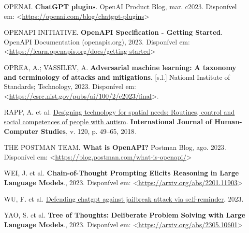 \documentclass[
]{article}
\newlength{\cslhangindent}
\newenvironment{CSLReferences}[2] %
 {\begin{list}{}{%
  \setlength{\itemindent}{0pt}
  \setlength{\leftmargin}{0pt}
  \setlength{\parsep}{0pt}
  \ifodd #1
   \setlength{\leftmargin}{\cslhangindent}
   \setlength{\itemindent}{-1\cslhangindent}
  \fi
  \setlength{\itemsep}{#2\baselineskip}}}
 {\end{list}}
\begin{document}
\begin{CSLReferences}{0}{1}
OPENAI. \textbf{{ChatGPT plugins}}. OpenAI Product Blog, mar. c2023.
Disponível em:
\textless{}\url{https://openai.com/blog/chatgpt-plugins}\textgreater{}

OPENAPI INITIATIVE. \textbf{{OpenAPI Specification - Getting Started}}.
OpenAPI Documentation (openapis.org), 2023. Disponível em:
\textless{}\url{https://learn.openapis.org/docs/getting-started}\textgreater{}

OPREA, A.; VASSILEV, A. \textbf{Adversarial machine learning: A taxonomy
and terminology of attacks and mitigations}. {[}s.l.{]} National
Institute of Standards; Technology, 2023. Disponível em:
\textless{}\url{https://csrc.nist.gov/pubs/ai/100/2/e2023/final}\textgreater.

RAPP, A. et al.
\href{https://doi.org/10.1016/j.ijhcs.2018.07.005}{Designing technology
for spatial needs: Routines, control and social competences of people
with autism}. \textbf{International Journal of Human-Computer Studies},
v. 120, p. 49--65, 2018.

THE POSTMAN TEAM. \textbf{{What is OpenAPI?}} Postman Blog, ago. 2023.
Disponível em:
\textless{}\url{https://blog.postman.com/what-is-openapi/}\textgreater{}

WEI, J. et al. \textbf{Chain-of-Thought Prompting Elicits Reasoning in
Large Language Models}., 2023. Disponível em:
\textless{}\url{https://arxiv.org/abs/2201.11903}\textgreater{}

WU, F. et al.
\href{https://www.researchsquare.com/article/rs-2873090/v1}{Defending
chatgpt against jailbreak attack via self-reminder}. 2023.

YAO, S. et al. \textbf{Tree of Thoughts: Deliberate Problem Solving with
Large Language Models}., 2023. Disponível em:
\textless{}\url{https://arxiv.org/abs/2305.10601}\textgreater{}

\end{CSLReferences}
\end{document}
